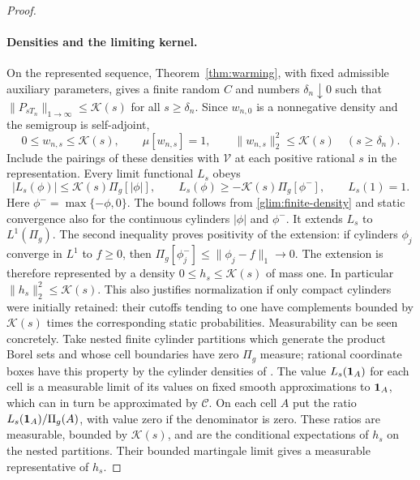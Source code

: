 \begin{proof}
\paragraph{Densities and the limiting kernel.}
On the represented sequence, Theorem~\ref{thm:warming}, with fixed
admissible auxiliary parameters, gives a finite
random \(C\) and numbers \(\delta_n\downarrow0\) such that
\(\|P_{sT_n}\|_{1\to\infty}\le \mathcal K(s)\) for all \(s\ge\delta_n\).
Since \(w_{n,0}\) is a nonnegative density and the semigroup is
self-adjoint,
\begin{equation}
 0\le w_{n,s}\le \mathcal K(s),\qquad
 \mu[w_{n,s}]=1,\qquad \|w_{n,s}\|_2^2\le \mathcal K(s)
 \quad(s\ge\delta_n).
 \label{glim:finite-density}
\end{equation}
Include the pairings of these densities with
\(\mathscr V\) at each positive rational \(s\) in the
representation.  Every
limit functional \(L_s\) obeys
\[
 |L_s(\phi)|\le \mathcal K(s)\Pi_g[|\phi|],\qquad
 L_s(\phi)\ge-\mathcal K(s)\Pi_g[\phi^-],\qquad L_s(1)=1.
\]
Here \(\phi^-=\max\{-\phi,0\}\).  The bound follows from
\eqref{glim:finite-density} and static convergence also for the
continuous cylinders \(|\phi|\) and \(\phi^-\).
It extends \(L_s\) to \(L^1(\Pi_g)\).  The second inequality proves
positivity of the extension: if cylinders \(\phi_j\) converge in
\(L^1\) to \(f\ge0\), then
\(\Pi_g[\phi_j^-]\le\|\phi_j-f\|_1\to0\).
The extension is therefore represented by a density
\(0\le h_s\le \mathcal K(s)\) of mass one.  In particular
\(\|h_s\|_2^2\le \mathcal K(s)\).  This also justifies normalization if only
compact cylinders were initially retained: their cutoffs tending to
one have complements bounded by \(\mathcal K(s)\) times the corresponding
static probabilities.  Measurability can be seen concretely.  Take nested
finite cylinder partitions which generate the product Borel sets and
whose cell boundaries have zero \(\Pi_g\) measure; rational coordinate
boxes have this property by the cylinder densities of
\cite[Proposition~2.3]{FUA}.  The value \(L_s(\mathbf 1_A)\) for each cell is
a measurable limit of its values on fixed smooth approximations to
\(\mathbf 1_A\), which can in turn be approximated by \(\mathscr C\).
On each cell \(A\) put the ratio
\(L_s(\mathbf 1_A)/\Pi_g(A)\), with value zero if the denominator is zero.
These ratios are measurable, bounded by \(\mathcal K(s)\), and are the
conditional expectations of \(h_s\) on the nested partitions.  Their
bounded martingale limit gives a measurable representative of \(h_s\).


\end{proof}
